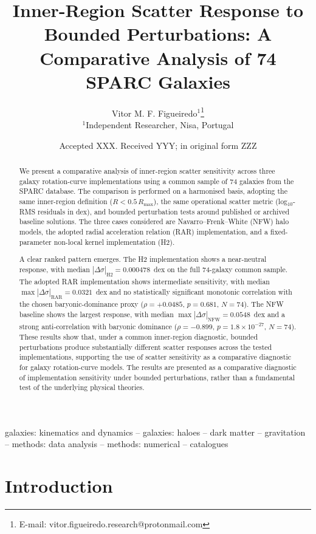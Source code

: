 \documentclass[fleqn,usenatbib]{mnras}
\title[Inner-region scatter response in SPARC]{Inner-Region Scatter Response to Bounded Perturbations: A Comparative Analysis of 74 SPARC Galaxies}
\author[V. M. F. Figueiredo]{
	Vitor M. F. Figueiredo$^{1}$\thanks{E-mail: vitor.figueiredo.research@protonmail.com}
	\\
	$^{1}$Independent Researcher, Nisa, Portugal
}
\date{Accepted XXX. Received YYY; in original form ZZZ}
\begin{document}
	\maketitle
	
\begin{abstract}
	We present a comparative analysis of inner-region scatter sensitivity 
	across three galaxy rotation-curve implementations using a common sample 
	of 74 galaxies from the SPARC database. The comparison is performed on a 
	harmonised basis, adopting the same inner-region definition 
	($R < 0.5\,R_{\max}$), the same operational scatter metric 
	(log$_{10}$-RMS residuals in dex), and bounded perturbation tests around 
	published or archived baseline solutions. The three cases considered are 
	Navarro--Frenk--White (NFW) halo models, the adopted radial acceleration 
	relation (RAR) implementation, and a fixed-parameter non-local kernel 
	implementation (H2).
	
	A clear ranked pattern emerges. The H2 implementation shows a 
	near-neutral response, with median 
	$|\Delta\sigma|_{\mathrm{H2}} = 0.000478$~dex on the full 74-galaxy 
	common sample. The adopted RAR implementation shows intermediate 
	sensitivity, with median $\max |\Delta\sigma|_{\mathrm{RAR}} = 0.0321$~dex 
	and no statistically significant monotonic correlation with the chosen 
	baryonic-dominance proxy ($\rho = +0.0485$, $p = 0.681$, $N = 74$). The 
	NFW baseline shows the largest response, with median 
	$\max |\Delta\sigma|_{\mathrm{NFW}} = 0.0548$~dex and a strong 
	anti-correlation with baryonic dominance 
	($\rho = -0.899$, $p = 1.8 \times 10^{-27}$, $N = 74$). These results 
	show that, under a common inner-region diagnostic, bounded perturbations 
	produce substantially different scatter responses across the tested 
	implementations, supporting the use of scatter sensitivity as a 
	comparative diagnostic for galaxy rotation-curve models. The results are 
	presented as a comparative diagnostic of implementation sensitivity 
	under bounded perturbations, rather than a fundamental test of the 
	underlying physical theories.
\end{abstract}
	
	\begin{keywords}
		galaxies: kinematics and dynamics -- galaxies: haloes -- dark matter -- gravitation -- methods: data analysis -- methods: numerical -- catalogues
	\end{keywords}
	
\section{Introduction}
\label{sec:intro}
\end{document}
